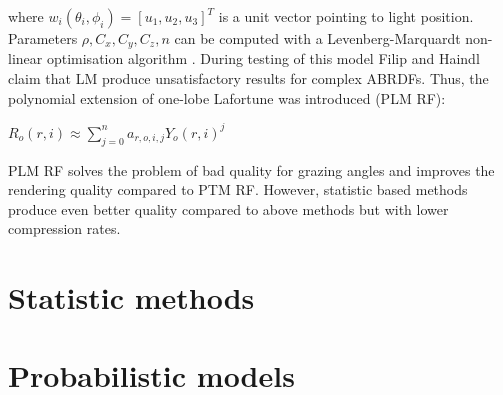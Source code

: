 where $w_{i}(\theta_{i}, \phi_{i})=[u_{1},u_{2},u_{3}]^{T}$ is a unit vector pointing to light position.
Parameters $\rho,C_{x},C_{y},C_{z},n$ can be computed with a Levenberg-Marquardt non-linear optimisation algorithm \cite{plm}. 
During testing of this model Filip and Haindl \cite{plm} claim that LM produce unsatisfactory results for complex ABRDFs.
 Thus, the polynomial extension of one-lobe Lafortune was introduced (PLM RF):

{\centering$R_{o}(r,i)\approx  \sum_{j=0}^{n} a_{r,o,i,j}Y_{o}(r,i)^j$\\}



PLM RF solves the problem of bad quality for grazing angles and improves the rendering quality compared to PTM RF.
However, statistic based methods produce even better quality compared to above methods but with lower compression rates.



  \section{Statistic methods}
\label{section:stat_methods}


 \section{Probabilistic models}
\label{section:prob_methods}